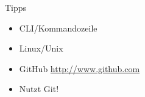 \begin{frame}{Tipps}
    \begin{itemize}[<+->]
        \item CLI/Kommandozeile
        \item Linux/Unix
        \item GitHub \url{http://www.github.com}
        \item Nutzt Git!
    \end{itemize}
\end{frame}



